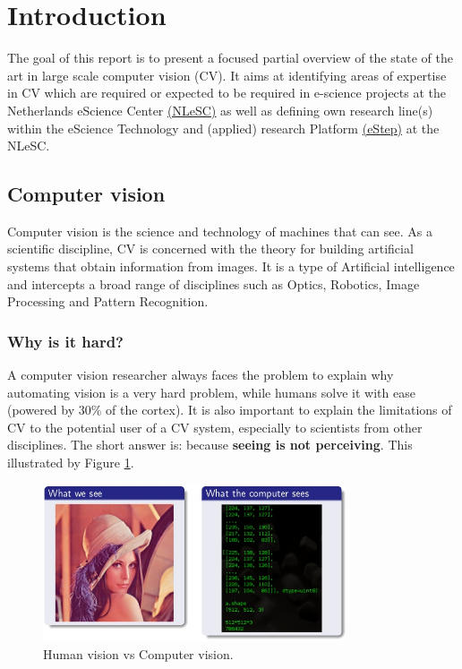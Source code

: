\section{Introduction}
\label{sec:intro}
  
The goal of this report is to present a focused partial overview of the state of the art in large scale computer vision (CV).  It aims at identifying areas of expertise in CV which are required or expected to be required in e-science projects at the Netherlands eScience Center \href{https://www.esciencecenter.nl/}{\underline{(NLeSC)}} as well as defining own research line(s) within the eScience Technology and (applied) research Platform \href{https://www.esciencecenter.nl/site/project/estep}{(\underline{eStep})} at the NLeSC.

\subsection{Computer vision}

Computer vision is the science and technology of machines that can see. As a scientific discipline, CV is concerned with the theory for building artificial systems that obtain information from images. It is a type of Artificial intelligence and intercepts a broad range of disciplines such as Optics, Robotics, Image Processing and Pattern Recognition. 

\subsubsection{Why is it hard?}
A computer vision researcher always faces the problem to explain why automating vision is a very hard problem, while humans solve it with ease (powered by $30\%$ of the cortex). It is also important to explain the limitations of CV to the potential user of a CV system, especially to scientists from other disciplines. The short answer is: because {\bf seeing is not perceiving}. This illustrated by Figure \ref{fig:CV}.
\begin{figure}[H]
\begin{center}
\includegraphics[width=0.8\textwidth]{fig/ManVsPC}
\end{center}
\caption{Human vision vs Computer vision.}
\label{fig:CV}
\end{figure}

